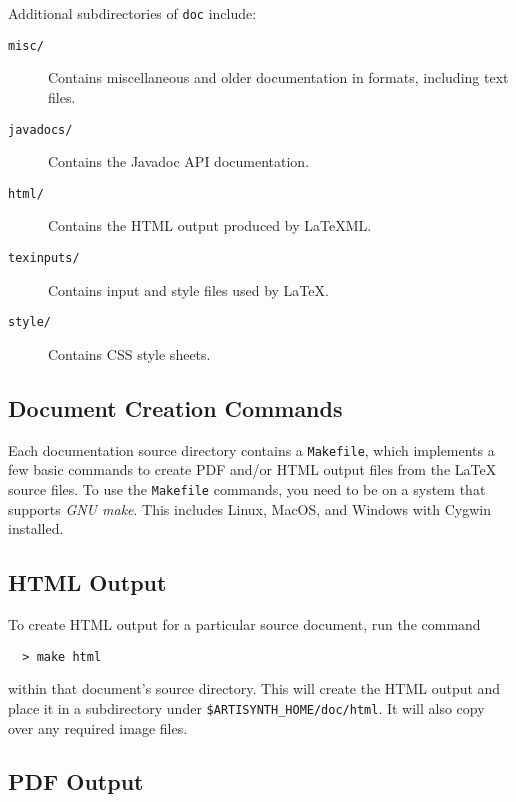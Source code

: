 \documentclass{article}
\begin{document}
Additional subdirectories of {\tt doc} include:

\begin{description}

\item[{\tt misc/} ] \mbox{}

Contains miscellaneous and older documentation in formats, including
text files.

\item[{\tt javadocs/} ] \mbox{}

Contains the Javadoc API documentation.

\item[{\tt html/} ] \mbox{}

Contains the HTML output produced by LaTeXML.

\item[{\tt texinputs/} ] \mbox{}

Contains input and style files used by LaTeX.

\item[{\tt style/} ] \mbox{}

Contains CSS style sheets.

\end{description}

\subsection{Document Creation Commands}

Each documentation source directory contains a {\tt Makefile}, which
implements a few basic commands to create PDF and/or HTML output files
from the LaTeX source files.  To use the {\tt Makefile} commands, you
need to be on a system that supports {\it GNU make}. This includes
Linux, MacOS, and Windows with Cygwin installed.

\subsection{HTML Output}

To create HTML output for a particular source document,
run the command
%
\begin{verbatim}
  > make html
\end{verbatim}
%
within that document's source directory. This will create the HTML
output and place it in a subdirectory under 
{\tt \$ARTISYNTH\_HOME/doc/html}. It will also
copy over any required image files.

\subsection{PDF Output}
\end{document}
